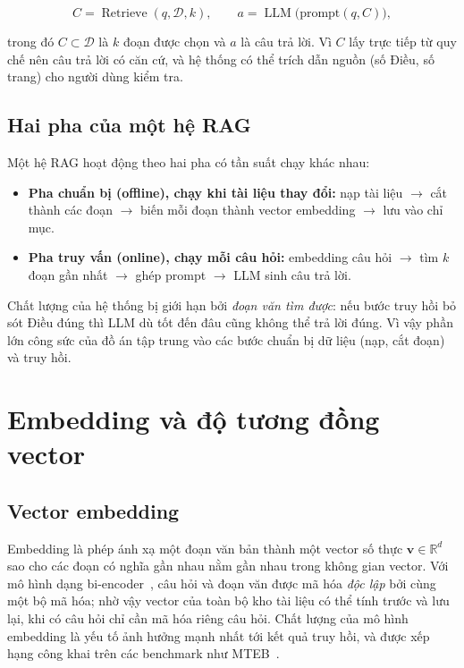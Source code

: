 \begin{equation}
  C = \operatorname{Retrieve}(q, \mathcal{D}, k), \qquad
  a = \operatorname{LLM}\big(\text{prompt}(q, C)\big),
\end{equation}

trong đó $C \subset \mathcal{D}$ là $k$ đoạn được chọn và $a$ là câu trả lời. Vì $C$ lấy trực tiếp từ quy chế nên câu trả lời có căn cứ, và hệ thống có thể trích dẫn nguồn (số Điều, số trang) cho người dùng kiểm tra.

\subsection{Hai pha của một hệ RAG}

Một hệ RAG hoạt động theo hai pha có tần suất chạy khác nhau:

\begin{itemize}
  \item \textbf{Pha chuẩn bị (offline), chạy khi tài liệu thay đổi:} nạp tài liệu $\rightarrow$ cắt thành các đoạn $\rightarrow$ biến mỗi đoạn thành vector embedding $\rightarrow$ lưu vào chỉ mục.
  \item \textbf{Pha truy vấn (online), chạy mỗi câu hỏi:} embedding câu hỏi $\rightarrow$ tìm $k$ đoạn gần nhất $\rightarrow$ ghép prompt $\rightarrow$ LLM sinh câu trả lời.
\end{itemize}

Chất lượng của hệ thống bị giới hạn bởi \emph{đoạn văn tìm được}: nếu bước truy hồi bỏ sót Điều đúng thì LLM dù tốt đến đâu cũng không thể trả lời đúng. Vì vậy phần lớn công sức của đồ án tập trung vào các bước chuẩn bị dữ liệu (nạp, cắt đoạn) và truy hồi.

\section{Embedding và độ tương đồng vector}

\subsection{Vector embedding}

Embedding là phép ánh xạ một đoạn văn bản thành một vector số thực $\mathbf{v} \in \mathbb{R}^d$ sao cho các đoạn có nghĩa gần nhau nằm gần nhau trong không gian vector. Với mô hình dạng bi-encoder~\cite{reimers2019sentencebert}, câu hỏi và đoạn văn được mã hóa \emph{độc lập} bởi cùng một bộ mã hóa; nhờ vậy vector của toàn bộ kho tài liệu có thể tính trước và lưu lại, khi có câu hỏi chỉ cần mã hóa riêng câu hỏi. Chất lượng của mô hình embedding là yếu tố ảnh hưởng mạnh nhất tới kết quả truy hồi, và được xếp hạng công khai trên các benchmark như MTEB~\cite{muennighoff2022mteb}.

